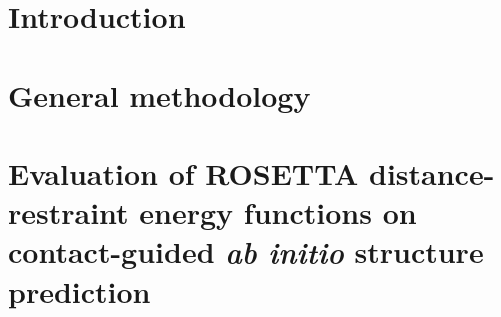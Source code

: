 \documentclass[11pt,oneside,reqno,openright]{report}
\begin{document}
% 

% 




\tableofcontents

\listoffigures

\listoftables

\printglossary

\chapter{Introduction}


\chapter{General methodology}



\chapter{Evaluation of ROSETTA distance-restraint energy functions on contact-guided \textit{ab initio} structure prediction}


\end{document}
